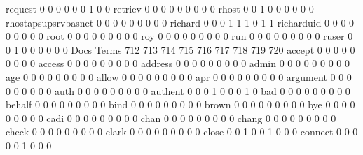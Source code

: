 \documentclass[compress,8pt]{beamer}
\begin{document}
\begin{frame}
\begin{Schunk}
  request                                    0   0   0   0   0   0   1   0   0
  retriev                                    0   0   0   0   0   0   0   0   0
  rhost                                      0   0   1   0   0   0   0   0   0
  rhostapsupsrvbasnet                        0   0   0   0   0   0   0   0   0
  richard                                    0   0   0   1   1   1   0   1   1
  richarduid                                 0   0   0   0   0   0   0   0   0
  root                                       0   0   0   0   0   0   0   0   0
  roy                                        0   0   0   0   0   0   0   0   0
  run                                        0   0   0   0   0   0   0   0   0
  ruser                                      0   0   1   0   0   0   0   0   0
                                          Docs
Terms                                      712 713 714 715 716 717 718 719 720
  accept                                     0   0   0   0   0   0   0   0   0
  access                                     0   0   0   0   0   0   0   0   0
  address                                    0   0   0   0   0   0   0   0   0
  admin                                      0   0   0   0   0   0   0   0   0
  age                                        0   0   0   0   0   0   0   0   0
  allow                                      0   0   0   0   0   0   0   0   0
  apr                                        0   0   0   0   0   0   0   0   0
  argument                                   0   0   0   0   0   0   0   0   0
  auth                                       0   0   0   0   0   0   0   0   0
  authent                                    0   0   0   1   0   0   0   1   0
  bad                                        0   0   0   0   0   0   0   0   0
  behalf                                     0   0   0   0   0   0   0   0   0
  bind                                       0   0   0   0   0   0   0   0   0
  brown                                      0   0   0   0   0   0   0   0   0
  bye                                        0   0   0   0   0   0   0   0   0
  cadi                                       0   0   0   0   0   0   0   0   0
  chan                                       0   0   0   0   0   0   0   0   0
  chang                                      0   0   0   0   0   0   0   0   0
  check                                      0   0   0   0   0   0   0   0   0
  clark                                      0   0   0   0   0   0   0   0   0
  close                                      0   0   1   0   0   1   0   0   0
  connect                                    0   0   0   0   0   1   0   0   0

\end{Schunk}
\end{frame}
\end{document}
